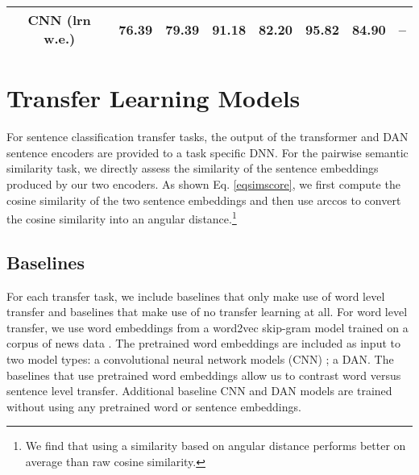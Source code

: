 \documentclass[11pt,a4paper]{article}
\begin{document}
\begin{table*}[ht!]
\begin{center}
\begin{tabular}{|c|c|c|c|c|c|c|c|}
CNN (lrn w.e.)  & 76.39  & 79.39  & 91.18  & 82.20  & 95.82  &  84.90 & -- \\
\hline
\end{tabular}
\end{center}
\caption{Model performance on transfer tasks. \emph{USE\_T} is the universal sentence encoder (USE) using Transformer. \emph{USE\_D} is the universal encoder DAN model. Models tagged with \emph{w2v w.e.}\ make use of pre-training word2vec skip-gram embeddings for the transfer task model, while models tagged with \emph{lrn w.e.}\ use randomly initialized word embeddings that are learned only on the transfer task data. Accuracy is reported for all evaluations except STS Bench where we report the Pearson correlation of the similarity scores with human judgments. Pairwise similarity scores are computed directly using the sentence embeddings from the universal sentence encoder as in Eq. (1).
}
\label{tab:trans-model-performance}
\end{table*}

\section{Transfer Learning Models}

For sentence classification transfer tasks, the output of the transformer and DAN sentence encoders are provided to a task specific DNN. For the pairwise semantic similarity task, we directly assess the similarity of the sentence embeddings produced by our two encoders. As shown Eq. \ref{eqsimscore}, we first compute the cosine similarity of the two sentence embeddings and then use arccos to convert the cosine similarity into an angular distance.\footnote{We find that using a similarity based on angular distance performs better on average than raw cosine similarity.}



\subsection{Baselines}

For each transfer task, we include baselines that only make use of word level transfer and baselines that make use of no transfer learning at all. For word level transfer, we use word embeddings from a word2vec skip-gram model trained on a corpus of news data \cite{mikolov2013}. The pretrained word embeddings are included as input to two model types: a convolutional neural network models (CNN) \cite{kim2014}; a DAN. The baselines that use pretrained word embeddings allow us to contrast word versus sentence level transfer. Additional baseline CNN and DAN models are trained without using any pretrained word or sentence embeddings.
\end{document}
